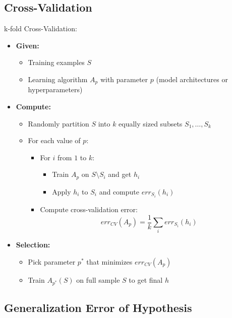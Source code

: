 \subsection{Cross-Validation}
k-fold Cross-Validation:
\begin{itemize}
    \item \textbf{Given:}
    \begin{itemize}
        \item Training examples $S$
        \item Learning algorithm $A_p$ with parameter $p$ (model architectures or hyperparameters)
    \end{itemize}
    \item \textbf{Compute:}
    \begin{itemize}
        \item Randomly partition $S$ into $k$ equally sized subsets $S_1, \ldots, S_k$
        \item For each value of $p$:
        \begin{itemize}
            \item For $i$ from $1$ to $k$:
            \begin{itemize}
                \item Train $A_p$ on $S \setminus S_i$ and get $h_i$
                \item Apply $h_i$ to $S_i$ and compute $err_{S_i}(h_i)$
            \end{itemize}
            \item Compute cross-validation error:
            \[
                err_{CV}(A_p) = \frac{1}{k} \sum_i err_{S_i}(h_i)
            \]
        \end{itemize}
    \end{itemize}
    \item \textbf{Selection:}
    \begin{itemize}
        \item Pick parameter $p^*$ that minimizes $err_{CV}(A_p)$
        \item Train $A_{p^*}(S)$ on full sample $S$ to get final $h$
    \end{itemize}
\end{itemize}

\subsection{Generalization Error of Hypothesis}

